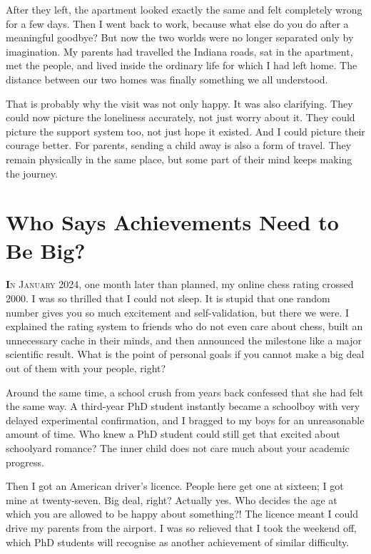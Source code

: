 \documentclass[11pt,twoside,openany]{book}
\newcommand{\dropcap}[2]{\lettrine[lines=3,findent=2pt,nindent=4pt]{\color{accent}\textsf{\textbf{#1}}}{#2}}
\begin{document}
After they left, the apartment looked exactly the same and felt completely
wrong for a few days. Then I went back to work, because what else do you do
after a meaningful goodbye? But now the two worlds were no longer separated
only by imagination. My parents had travelled the Indiana roads, sat in the
apartment, met the people, and lived inside the ordinary life for which I had
left home. The distance between our two homes was finally something we all
understood.

That is probably why the visit was not only happy. It was also clarifying.
They could now picture the loneliness accurately, not just worry about it.
They could picture the support system too, not just hope it existed. And I
could picture their courage better. For parents, sending a child away is also
a form of travel. They remain physically in the same place, but some part of
their mind keeps making the journey.

\chapter{Who Says Achievements Need to Be Big?}

\dropcap{I}{n January 2024,} one month later than planned, my online chess
rating crossed 2000. I was so thrilled that I could not sleep. It is stupid
that one random number gives you so much excitement and self-validation, but
there we were. I explained the rating system to friends who do not even care
about chess, built an unnecessary cache in their minds, and then announced the
milestone like a major scientific result. What is the point of personal goals
if you cannot make a big deal out of them with your people, right?

Around the same time, a school crush from years back confessed that she had
felt the same way. A third-year PhD student instantly became a schoolboy with
very delayed experimental confirmation, and I bragged to my boys for an
unreasonable amount of time. Who knew a PhD student could still get that
excited about schoolyard romance? The inner child does not care much about
your academic progress.

Then I got an American driver's licence. People here get one at sixteen; I got
mine at twenty-seven. Big deal, right? Actually yes. Who decides the age at
which you are allowed to be happy about something?! The licence meant I could
drive my parents from the airport. I was so relieved that I took the weekend
off, which PhD students will recognise as another achievement of similar
difficulty.
\end{document}

